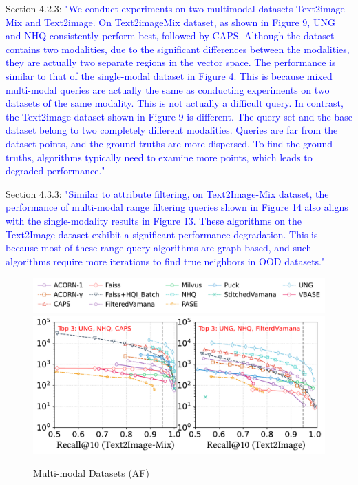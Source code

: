\documentclass[sigconf, nonacm]{acmart}
\begin{document}
Section 4.2.3: \textcolor{blue}{
	"We conduct experiments on two multimodal datasets Text2image-Mix and Text2image. On Text2imageMix dataset, as shown in Figure 9, UNG and NHQ consistently perform best, followed by CAPS. Although the dataset contains two modalities, due to the significant differences between the modalities, they are actually two separate regions in the vector space. The performance is similar to that of the single-modal dataset in Figure 4. This is because mixed multi-modal queries are actually the same as conducting experiments on two datasets of the same modality. This is not actually a difficult query. In contrast, the Text2image dataset shown in Figure 9 is different. The query set and the base dataset belong to two completely different modalities. Queries are far from the dataset points, and the ground truths are more dispersed. To find the ground truths, algorithms typically need to examine more points, which leads to degraded performance." 
}

Section 4.3.3:\textcolor{blue}{
		"Similar to attribute filtering, on Text2Image-Mix dataset, the performance of multi-modal range filtering queries shown in Figure 14 also aligns with the single-modality results in Figure 13. These algorithms on the Text2Image dataset exhibit a significant performance degradation. This is because most of these range query algorithms are graph-based, and such algorithms require more iterations to find true neighbors in OOD datasets."
}

\begin{figure}[htbp]
	\centering
	\includegraphics[width=0.95\linewidth]{fig/attribute_legend.pdf}
	\includegraphics[width=\linewidth]{fig/attribute_multimodel_2.pdf}
	\caption{Multi-modal Datasets (AF)}
	\label{fig:attribute_multimodel}
\end{figure}
\end{document}
